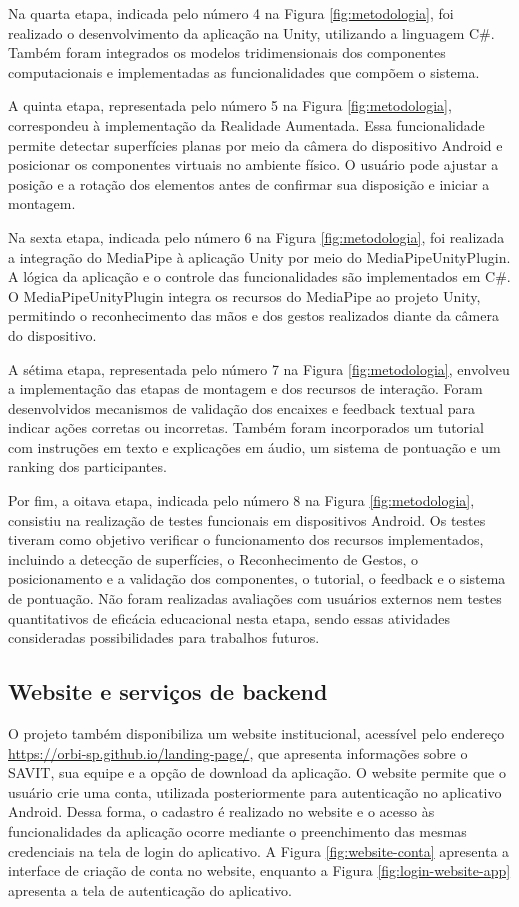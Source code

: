 \documentclass[11pt,a4paper]{article}
\begin{document}
Na quarta etapa, indicada pelo número 4 na Figura \ref{fig:metodologia}, foi realizado o desenvolvimento da aplicação na Unity, utilizando a linguagem C\#. Também foram integrados os modelos tridimensionais dos componentes computacionais e implementadas as funcionalidades que compõem o sistema.

A quinta etapa, representada pelo número 5 na Figura \ref{fig:metodologia}, correspondeu à implementação da Realidade Aumentada. Essa funcionalidade permite detectar superfícies planas por meio da câmera do dispositivo Android e posicionar os componentes virtuais no ambiente físico. O usuário pode ajustar a posição e a rotação dos elementos antes de confirmar sua disposição e iniciar a montagem.

Na sexta etapa, indicada pelo número 6 na Figura \ref{fig:metodologia}, foi realizada a integração do MediaPipe à aplicação Unity por meio do MediaPipeUnityPlugin. A lógica da aplicação e o controle das funcionalidades são implementados em C\#. O MediaPipeUnityPlugin integra os recursos do MediaPipe ao projeto Unity, permitindo o reconhecimento das mãos e dos gestos realizados diante da câmera do dispositivo.

A sétima etapa, representada pelo número 7 na Figura \ref{fig:metodologia}, envolveu a implementação das etapas de montagem e dos recursos de interação. Foram desenvolvidos mecanismos de validação dos encaixes e feedback textual para indicar ações corretas ou incorretas. Também foram incorporados um tutorial com instruções em texto e explicações em áudio, um sistema de pontuação e um ranking dos participantes.

Por fim, a oitava etapa, indicada pelo número 8 na Figura \ref{fig:metodologia}, consistiu na realização de testes funcionais em dispositivos Android. Os testes tiveram como objetivo verificar o funcionamento dos recursos implementados, incluindo a detecção de superfícies, o Reconhecimento de Gestos, o posicionamento e a validação dos componentes, o tutorial, o feedback e o sistema de pontuação. Não foram realizadas avaliações com usuários externos nem testes quantitativos de eficácia educacional nesta etapa, sendo essas atividades consideradas possibilidades para trabalhos futuros.


\subsection{Website e serviços de backend}

O projeto também disponibiliza um website institucional, acessível pelo endereço \url{https://orbi-sp.github.io/landing-page/}, que apresenta informações sobre o SAVIT, sua equipe e a opção de download da aplicação. O website permite que o usuário crie uma conta, utilizada posteriormente para autenticação no aplicativo Android. Dessa forma, o cadastro é realizado no website e o acesso às funcionalidades da aplicação ocorre mediante o preenchimento das mesmas credenciais na tela de login do aplicativo. A Figura \ref{fig:website-conta} apresenta a interface de criação de conta no website, enquanto a Figura \ref{fig:login-website-app} apresenta a tela de autenticação do aplicativo.
\end{document}
